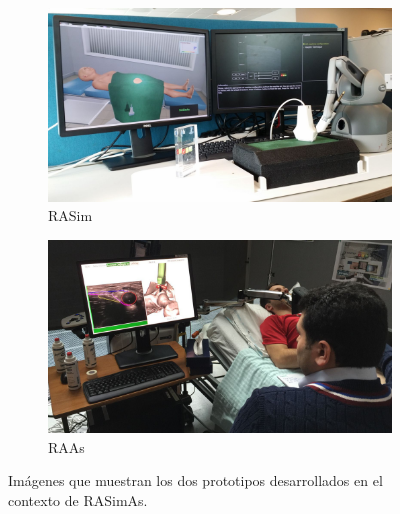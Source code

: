 \begin{figure}[ht]
  \centering
  \begin{subfigure}[b]{0.5\linewidth}
    \centering\includegraphics[width=1\textwidth]{IMG/sim3.jpg}
    \caption{\acs{RASim} \label{subfig:rasim}}
  \end{subfigure}%
  \begin{subfigure}[b]{0.5\linewidth}
    \centering\includegraphics[width=1\textwidth]{IMG/raas.JPG}
    \caption{\acs{RAAs} \label{subfig:raas}}
  \end{subfigure}
  \caption{Imágenes que muestran los dos prototipos desarrollados en el contexto de \acs{RASimAs}.}
\end{figure}


